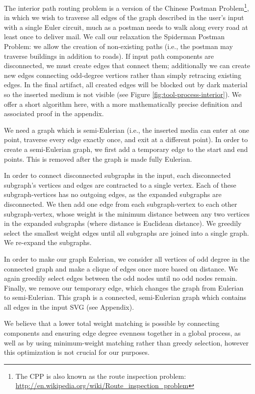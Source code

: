 The interior path routing problem is a version of the Chinese Postman Problem\footnote{The CPP is also known as the route inspection problem: \url{http://en.wikipedia.org/wiki/Route_inspection_problem}}, in which we wish to traverse all edges of the graph described in the user's input with a single Euler circuit, much as a postman needs to walk along every road at least once to deliver mail.  We call our relaxation the Spiderman Postman Problem: we allow the creation of non-existing paths (i.e., the postman may traverse buildings in addition to roads).  If input path components are disconnected, we must create edges that connect them; additionally we can create new edges connecting odd-degree vertices rather than simply retracing existing edges.  In the final artifact, all created edges will be blocked out by dark material so the inserted medium is not visible (see Figure \ref{fig:tool-process-interior}).  We offer a short algorithm here, with a more mathematically precise definition and associated proof in the appendix.

We need a graph which is semi-Eulerian (i.e., the inserted media can enter at one point, traverse every edge exactly once, and exit at a different point).  In order to create a semi-Eulerian graph, we first add a temporary edge to the start and end points.  This is removed after the graph is made fully Eulerian.

In order to connect disconnected subgraphs in the input, each disconnected subgraph's vertices and edges are contracted to a single vertex.  Each of these subgraph-vertices has no outgoing edges, as the expanded subgraphs are disconnected.  We then add one edge from each subgraph-vertex to each other subgraph-vertex, whose weight is the minimum distance between any two vertices in the expanded subgraphs (where distance is Euclidean distance).  We greedily select the smallest weight edges until all subgraphs are joined into a single graph.  We re-expand the subgraphs.

In order to make our graph Eulerian, we consider all vertices of odd degree in the connected graph and make a clique of edges once more based on distance.  We again greedily select edges between the odd nodes until no odd nodes remain.  Finally, we remove our temporary edge, which changes the graph from Eulerian to semi-Eulerian.  This graph is a connected, semi-Eulerian graph which contains all edges in the input SVG (see Appendix).

We believe that a lower total weight matching is possible by connecting components and ensuring edge degree evenness together in a global process, as well as by using minimum-weight matching rather than greedy selection, however this optimization is not crucial for our purposes.

